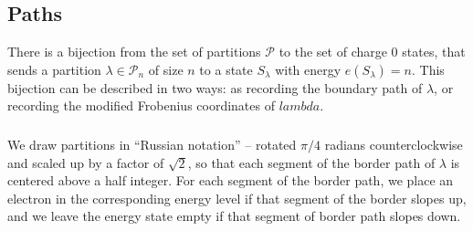 \documentclass{amsart}[12pt]
\theoremstyle{definition}
\begin{document}
\subsection{Paths}

There is a bijection from the set of partitions $\mathcal{P}$ to the
set of charge 0 states, that sends a partition
$\lambda\in\mathcal{P}_n$ of size $n$ to a state $S_\lambda$ with
energy $e(S_\lambda)=n$.  This bijection can be described in two ways:
as recording the boundary path of $\lambda$, or recording the modified
Frobenius coordinates of $lambda$.


\subsubsection{}
We draw partitions in ``Russian
notation'' -- rotated $\pi/4$ radians counterclockwise and scaled up
by a factor of $\sqrt{2}$, so that each segment of the border path of
$\lambda$ is centered above a half integer.  For each segment of the border path, we place an electron in the corresponding energy level if that segment of the border slopes up, and we leave the energy state empty if that segment of border path slopes down.
\end{document}
